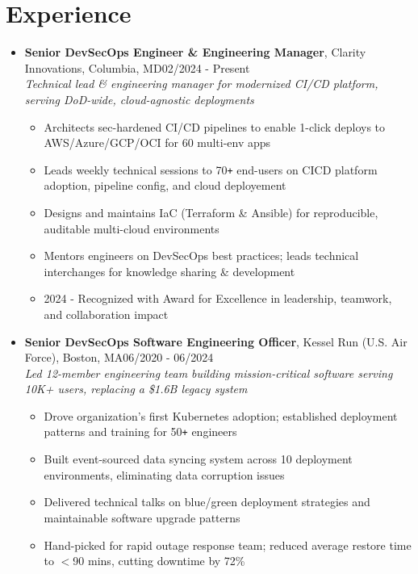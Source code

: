 \documentclass{article}
\begin{document}
\section{Experience} 
\begin{itemize}
    \itemsep0.2em
    \item \textbf{Senior DevSecOps Engineer \& Engineering Manager}, Clarity Innovations, Columbia, MD\hfill 02/2024 - Present \\ \emph{ Technical lead \& engineering manager for modernized CI/CD platform, serving DoD-wide, cloud-agnostic deployments}
    \begin{itemize}
        \itemsep0em
        \item Architects sec-hardened CI/CD pipelines to enable 1-click deploys to AWS/Azure/GCP/OCI for 60 multi-env apps
        \item Leads weekly technical sessions to 70\verb!+! end-users on CICD platform adoption, pipeline config, and cloud deployement
        \item Designs and maintains IaC (Terraform \& Ansible) for reproducible, auditable multi-cloud environments
        \item Mentors engineers on DevSecOps best practices; leads technical interchanges for knowledge sharing \& development
        \item 2024 - Recognized with Award for Excellence in leadership, teamwork, and collaboration impact
    \end{itemize}
    
    \item \textbf{Senior DevSecOps Software Engineering Officer}, Kessel Run (U.S. Air Force), Boston, MA\hfill 06/2020 - 06/2024 \\ \emph{Led 12-member engineering team building mission-critical software serving 10K+ users, replacing a \$1.6B legacy system}
    \begin{itemize}
        \itemsep0em
        \item Drove organization's first Kubernetes adoption; established deployment patterns and training for 50\verb!+! engineers
        \item Built event-sourced data syncing system across 10 deployment environments, eliminating data corruption issues
        \item Delivered technical talks on blue/green deployment strategies and maintainable software upgrade patterns
        \item Hand-picked for rapid outage response team; reduced average restore time to $<$90 mins, cutting downtime by 72\%
    \end{itemize}
    

\end{itemize}
\end{document}
